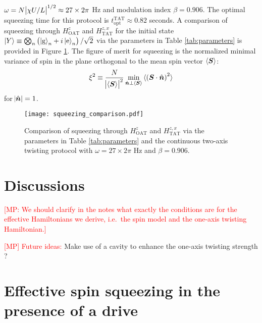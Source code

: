 \documentclass[aps,notitlepage,nofootinbib,11pt]{revtex4-1}
\renewcommand{\t}{\text} %
\newcommand{\f}[2]{\dfrac{#1}{#2}} %
\newcommand{\p}[1]{\left(#1\right)} %
\renewcommand{\v}{\bm} %
\renewcommand{\c}{\cdot} %
\newcommand{\bk}{\braket} %
\newcommand{\g}{\text{g}} %
\newcommand{\e}{\text{e}}
\newcommand{\1}{\hat{\mathds{1}}}
\newcommand{\note}[1]{\textcolor{red}{#1}}
\begin{document}
$\omega=N\abs{\chi U/L}^{1/2}\approx27\times2\pi$ Hz and modulation
index $\beta=0.906$.  The optimal squeezing time for this protocol is
$t_{\t{opt}}^{\t{TAT}}\approx0.82$ seconds.  A comparison of squeezing
through $H_{\t{OAT}}^z$ and $H_{\t{TAT}}^{z,x}$ for the initial state
$\ket{Y}\equiv\bigotimes_n\p{\ket{\g}_n+i\ket{\e}_n}/\sqrt2$ via the
parameters in Table \ref{tab:parameters} is provided in Figure
\ref{fig:squeezing_comparison}.  The figure of merit for squeezing is
the normalized minimal variance of spin in the plane orthogonal to the
mean spin vector $\bk{\v S}$:
\begin{align}
  \xi^2 \equiv \f{N}{\abs{\bk{\v S}}^2}
  \min_{\hat{\v n}\perp\bk{\v S}} \bk{\p{\v S\c\hat{\v n}}^2}
\end{align}
for $\abs{\hat{\v n}}=1$.

\begin{figure}
  \centering
  \texttt{[image: squeezing\_comparison.pdf]}
  \caption{Comparison of squeezing through $H_{\t{OAT}}^z$ and
    $H_{\t{TAT}}^{z,x}$ via the parameters in Table
    \ref{tab:parameters} and the continuous two-axis twisting protocol
    with $\omega=27\times2\pi$ Hz and $\beta=0.906$.}
  \label{fig:squeezing_comparison}
\end{figure}





\section{Discussions}

\note{[MP: We should clarify in the notes what exactly the conditions
  are for the effective Hamiltonians we derive, i.e.~the spin model
  and the one-axis twisting Hamiltonian.]}

\note{[MP] Future ideas:} Make use of a cavity to enhance the one-axis
twisting strength \cite{hu2017vacuum}?


\appendix

\section{Effective spin squeezing in the presence of a drive}
\label{sec:effective_squeezing_drive}
\end{document}
